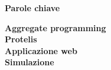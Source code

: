 \clearemptydoublepage{}
\thispagestyle{empty}
\vspace*{20ex}
\begin{flushright}
    \begin{LARGE}
        \textbf{Parole chiave}\\
        \vspace{5ex}
    \end{LARGE}
    \begin{normalsize}
        \textbf{%
            Aggregate programming\\%
            \medskip
            Protelis\\%
            \medskip
            Applicazione web\\%
            \medskip
            Simulazione
        }
    \end{normalsize}
\end{flushright}
\vfill

